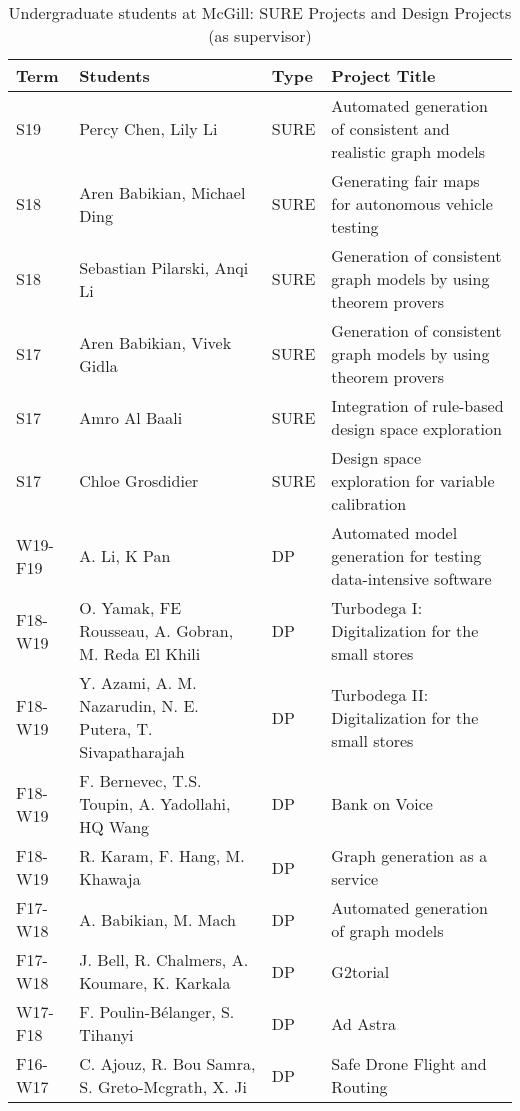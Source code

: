 \begin{table}[b!]
\footnotesize
\begin{tabular}{@{}lp{7.5cm}lp{8.8cm}@{}}
\toprule
\textbf{Term} & \textbf{Students} & \textbf{Type} & \textbf{Project Title} \\ \midrule
S19 & Percy Chen, Lily Li & SURE& Automated generation of consistent and realistic graph models\\
S18 & Aren Babikian, Michael Ding & SURE & Generating fair maps for autonomous vehicle testing\\
S18 & Sebastian Pilarski, Anqi Li& SURE & Generation of consistent graph models by using theorem provers\\
S17 & Aren Babikian, Vivek Gidla & SURE & Generation of consistent graph models by using theorem provers\\
S17 & Amro Al Baali & SURE & Integration of rule-based design space exploration\\ %
S17 & Chloe Grosdidier & SURE & Design space exploration for variable calibration\\ \midrule
W19-F19 & A. Li, K Pan & DP  & Automated model generation for testing data-intensive software \\ %
F18-W19 & O. Yamak, FE Rousseau, A. Gobran, M. Reda El Khili & DP  & Turbodega I: Digitalization for the small stores\\
F18-W19 & Y. Azami, A. M. Nazarudin, N. E. Putera, T. Sivapatharajah & DP  & Turbodega II: Digitalization for the small stores\\
F18-W19 & F. Bernevec, T.S. Toupin, A. Yadollahi, HQ Wang & DP  & Bank on Voice \\
F18-W19 & R. Karam, F. Hang, M. Khawaja& DP  & Graph generation as a service\\
F17-W18 & A. Babikian, M. Mach & DP  & Automated generation of graph models\\
F17-W18 & J. Bell, R. Chalmers, A. Koumare, K. Karkala & DP & G2torial\\
W17-F18 & F. Poulin-B\'elanger, S. Tihanyi & DP  & Ad Astra\\
F16-W17 & C. Ajouz, R. Bou Samra, S. Greto-Mcgrath, X. Ji & DP  & Safe Drone Flight and Routing\\ %
\bottomrule
\end{tabular}
\caption{Undergraduate students at McGill: SURE Projects and Design Projects (as supervisor)}
\label{tab:ug-supervised}
\end{table}

